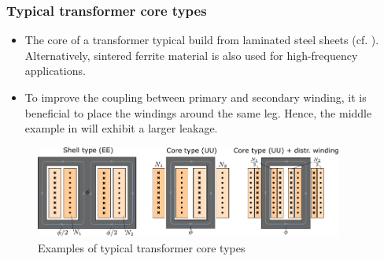 \begin{frame}
	\frametitle{Typical transformer core types}
	\begin{itemize}
		\item The core of a transformer typical build from laminated steel sheets (cf. ). Alternatively, sintered ferrite material is also used for high-frequency applications.
		\item<2-> To improve the coupling between primary and secondary winding, it is beneficial to place the windings around the same leg. Hence, the middle example in  will exhibit a larger leakage.
	\end{itemize}
	\begin{figure}
		\includegraphics[width=0.9\textwidth]{fig/lec04/Transformer_cores.pdf}
		\caption{Examples of typical transformer core types}
		\label{fig:Transformer_cores}
	\end{figure}
\end{frame}

